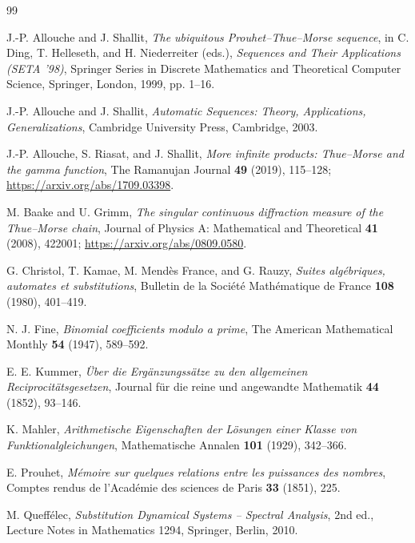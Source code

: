 \documentclass[11pt,oneside]{article}
\theoremstyle{definition}
\theoremstyle{remark}
\newcommand{\1}{\mathbf 1}
\begin{document}
\begin{thebibliography}{99}

J.-P. Allouche and J. Shallit,
\emph{The ubiquitous Prouhet--Thue--Morse sequence},
in C. Ding, T. Helleseth, and H. Niederreiter (eds.),
\emph{Sequences and Their Applications (SETA '98)},
Springer Series in Discrete Mathematics and Theoretical Computer Science,
Springer, London, 1999, pp. 1--16.

J.-P. Allouche and J. Shallit,
\emph{Automatic Sequences: Theory, Applications, Generalizations},
Cambridge University Press, Cambridge, 2003.

J.-P. Allouche, S. Riasat, and J. Shallit,
\emph{More infinite products: Thue--Morse and the gamma function},
The Ramanujan Journal \textbf{49} (2019), 115--128;
\url{https://arxiv.org/abs/1709.03398}.

M. Baake and U. Grimm,
\emph{The singular continuous diffraction measure of the Thue--Morse chain},
Journal of Physics A: Mathematical and Theoretical \textbf{41} (2008), 422001;
\url{https://arxiv.org/abs/0809.0580}.

G. Christol, T. Kamae, M. Mend\`es France, and G. Rauzy,
\emph{Suites alg\'ebriques, automates et substitutions},
Bulletin de la Soci\'et\'e Math\'ematique de France \textbf{108} (1980), 401--419.

N. J. Fine,
\emph{Binomial coefficients modulo a prime},
The American Mathematical Monthly \textbf{54} (1947), 589--592.

E. E. Kummer,
\emph{\"Uber die Erg\"anzungss\"atze zu den allgemeinen Reciprocit\"atsgesetzen},
Journal f\"ur die reine und angewandte Mathematik \textbf{44} (1852), 93--146.

K. Mahler,
\emph{Arithmetische Eigenschaften der L\"osungen einer Klasse von Funktionalgleichungen},
Mathematische Annalen \textbf{101} (1929), 342--366.

E. Prouhet,
\emph{M\'emoire sur quelques relations entre les puissances des nombres},
Comptes rendus de l'Acad\'emie des sciences de Paris \textbf{33} (1851), 225.

M. Queff\'elec,
\emph{Substitution Dynamical Systems -- Spectral Analysis},
2nd ed., Lecture Notes in Mathematics 1294, Springer, Berlin, 2010.


\end{thebibliography}
\end{document}
